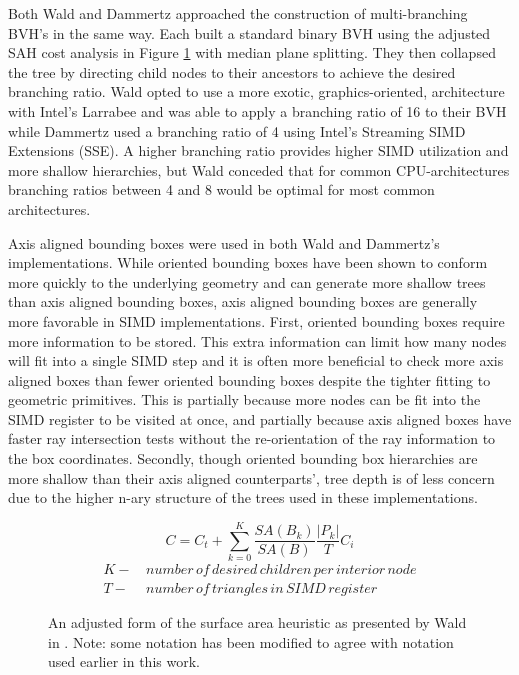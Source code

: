 Both Wald and Dammertz approached the construction of multi-branching BVH's in
the same way. Each built a standard binary BVH using the adjusted SAH cost
analysis in Figure \ref{adjusted_SAH} with median plane splitting. They then
collapsed the tree by directing child nodes to their ancestors to achieve the
desired branching ratio. Wald opted to use a more exotic, graphics-oriented,
architecture with Intel's Larrabee and was able to apply a branching ratio of 16
to their BVH while Dammertz used a branching ratio of 4 using Intel's Streaming
SIMD Extensions (SSE). A higher branching ratio provides higher SIMD utilization
and more shallow hierarchies, but Wald conceded that for common CPU-architectures
branching ratios between 4 and 8 would be optimal for most common architectures.

Axis aligned bounding boxes were used in both Wald and Dammertz's
implementations. While oriented bounding boxes have been shown to conform more
quickly to the underlying geometry and can generate more shallow trees than axis
aligned bounding boxes, axis aligned bounding boxes are generally more favorable
in SIMD implementations. First, oriented bounding boxes require more
information to be stored. This extra information can limit how many nodes will fit into a single
SIMD step and it is often more beneficial to check more axis aligned boxes than
fewer oriented bounding boxes despite the tighter fitting to geometric
primitives. This is partially because more nodes can be fit into the SIMD
register to be visited at once, and partially because axis aligned boxes have
faster ray intersection tests without the re-orientation of the ray information
to the box coordinates. Secondly, though oriented bounding box hierarchies are
more shallow than their axis aligned counterparts', tree depth is of less
concern due to the higher n-ary structure of the trees used in these
implementations.

\begin{figure}[H]
  \begin{equation}
    C = C_t + \sum_{k=0}^{K} \frac{SA(B_k)}{SA(B)}\frac{|P_k|}{T}C_i
  \end{equation}
  \begin{align*}
    K - & \, number \, of \, desired \, children \, per \, interior \, node \\
    T - & \, number \, of \, triangles \, in \, SIMD \, register
  \end{align*}
  \caption{An adjusted form of the surface area heuristic as presented by Wald
    in \cite{Wald_2008}. Note: some notation has been modified to agree with
    notation used earlier in this work.}
  \label{adjusted_SAH}
\end{figure}

